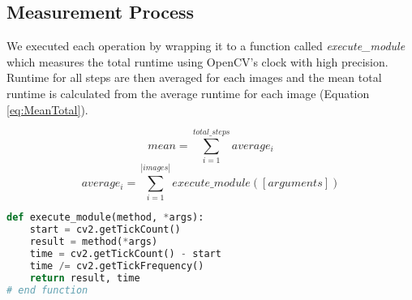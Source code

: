 
\subsection{Measurement Process}
We executed each operation by wrapping it to a function called {\it execute\_module} which measures the total runtime using OpenCV's clock with high precision. Runtime for all steps are then averaged for each images and the mean total runtime is calculated from the average runtime for each image (Equation \ref{eq:MeanTotal}).

\begin{equation}\label{eq:MeanTotal}
mean = \sum^{total\_steps}_{i=1}{average_i}
\end{equation}
\begin{equation}
average_i = \sum^{| images |}_{i=1}{execute\_module([arguments])}
\end{equation}

\begin{lstlisting}[language=Python]
def execute_module(method, *args):
    start = cv2.getTickCount()
    result = method(*args)
    time = cv2.getTickCount() - start
    time /= cv2.getTickFrequency()
    return result, time
# end function
\end{lstlisting}

